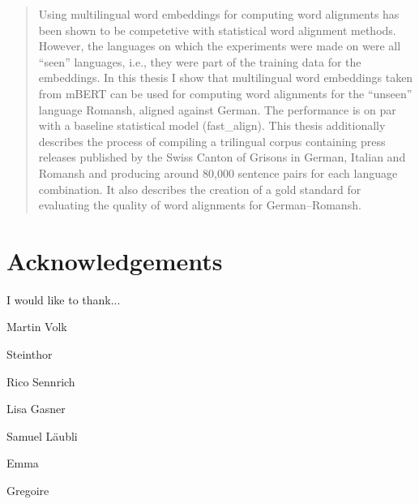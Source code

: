 \newpage
{} %
\begin{abstract}





Using multilingual word embeddings for computing word alignments has been shown to be competetive with statistical word alignment methods. 
However, the languages on which the experiments were made on were all \enquote{seen} languages, i.e., they were part of the training data for the embeddings. 
In this thesis I show that multilingual word embeddings taken from mBERT can be used for computing word alignments for the \enquote{unseen} language Romansh, aligned against German.
The performance is on par with a baseline statistical model (fast\_align). 
This thesis additionally describes the process of compiling a trilingual corpus containing press releases published by the Swiss Canton of Grisons in German, Italian and Romansh and producing around 80,000 sentence pairs for each language combination. 
It also describes the creation of a gold standard for evaluating the quality of word alignments for German--Romansh.

\end{abstract}


{}
\section*{Acknowledgements}
I would like to thank...

Martin Volk

Steinthor

Rico Sennrich

Lisa Gasner

Samuel Läubli

Emma 

Gregoire



